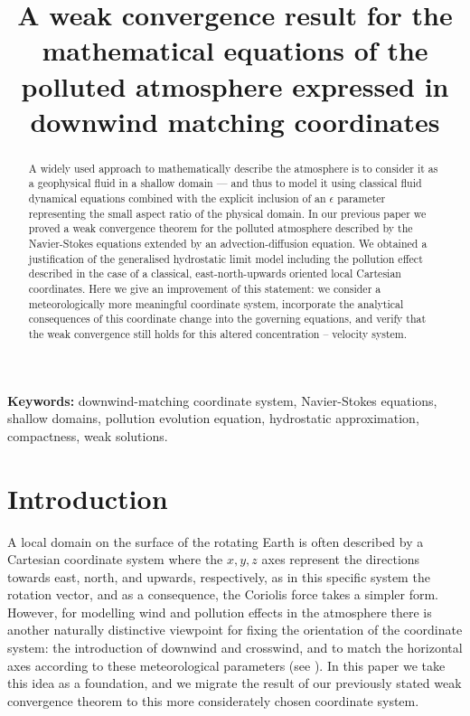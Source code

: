\documentclass[11pt]{article}
\title{A weak convergence result for the mathematical equations of the polluted atmosphere expressed in downwind matching coordinates}
\date{}
\begin{document}
\maketitle

\begin{abstract}

A widely used approach to mathematically describe the atmosphere is to consider it as a geophysical fluid in a shallow domain --- and thus to model it using classical fluid dynamical equations combined with the explicit inclusion of an $\epsilon$ parameter representing the small aspect ratio of the physical domain. In our previous paper we proved a weak convergence theorem for the polluted atmosphere described by the Navier-Stokes equations extended by an advection-diffusion equation. We obtained a justification of the generalised hydrostatic limit model including the pollution effect described in the case of a classical, east-north-upwards oriented local Cartesian coordinates. Here we give an improvement of this statement: we consider a meteorologically more meaningful coordinate system, incorporate the analytical consequences of this coordinate change into the governing equations, and verify that the weak convergence still holds for this altered concentration -- velocity system.

\end{abstract}

{\bf Keywords:} downwind-matching coordinate system, Navier-Stokes equations, shallow domains, pollution evolution equation, hydrostatic approximation, compactness, weak solutions.

\newpage

\tableofcontents
\newpage

\section{Introduction} \label{Introduction}

A local domain on the surface of the rotating Earth is often described by a Cartesian coordinate system where the $x, y, z$ axes represent the directions towards east, north, and upwards, respectively, as in this specific system the rotation vector, and as a consequence, the Coriolis force takes a simpler form. However, for modelling wind and pollution effects in the atmosphere there is another naturally distinctive viewpoint for fixing the orientation of the coordinate system: the introduction of downwind and crosswind, and to match the horizontal axes according to these meteorological parameters (see \cite{goyal2011mathematical}). In this paper we take this idea as a foundation, and we migrate the result of our previously stated weak convergence theorem to this more considerately chosen coordinate system.
\end{document}
